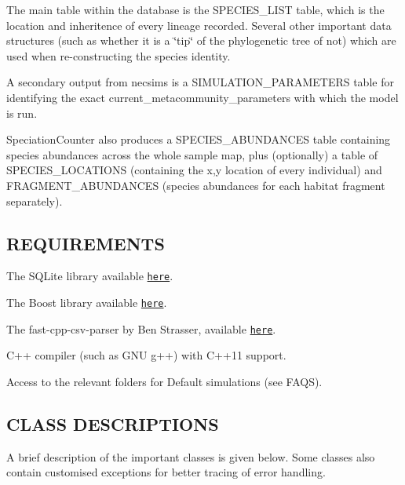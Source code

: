 \begin{DoxyItemize}
\item The main table within the database is the S\+P\+E\+C\+I\+E\+S\+\_\+\+L\+I\+ST table, which is the location and inheritence of every lineage recorded. Several other important data structures (such as whether it is a \char`\"{}tip\char`\"{} of the phylogenetic tree of not) which are used when re-\/constructing the species identity.
\item A secondary output from necsims is a S\+I\+M\+U\+L\+A\+T\+I\+O\+N\+\_\+\+P\+A\+R\+A\+M\+E\+T\+E\+RS table for identifying the exact current\+\_\+metacommunity\+\_\+parameters with which the model is run.
\item Speciation\+Counter also produces a S\+P\+E\+C\+I\+E\+S\+\_\+\+A\+B\+U\+N\+D\+A\+N\+C\+ES table containing species abundances across the whole sample map, plus (optionally) a table of S\+P\+E\+C\+I\+E\+S\+\_\+\+L\+O\+C\+A\+T\+I\+O\+NS (containing the x,y location of every individual) and F\+R\+A\+G\+M\+E\+N\+T\+\_\+\+A\+B\+U\+N\+D\+A\+N\+C\+ES (species abundances for each habitat fragment separately).
\end{DoxyItemize}

\subsection*{R\+E\+Q\+U\+I\+R\+E\+M\+E\+N\+TS}


\begin{DoxyItemize}
\item The S\+Q\+Lite library available \href{https://www.sqlite.org/download.html}{\tt here}.
\item The Boost library available \href{http://www.boost.org}{\tt here}.
\item The fast-\/cpp-\/csv-\/parser by Ben Strasser, available \href{https://github.com/ben-strasser/fast-cpp-csv-parser}{\tt here}.
\item C++ compiler (such as G\+NU g++) with C++11 support.
\item Access to the relevant folders for Default simulations (see F\+A\+QS).
\end{DoxyItemize}

\subsection*{C\+L\+A\+SS D\+E\+S\+C\+R\+I\+P\+T\+I\+O\+NS}

A brief description of the important classes is given below. Some classes also contain customised exceptions for better tracing of error handling.


